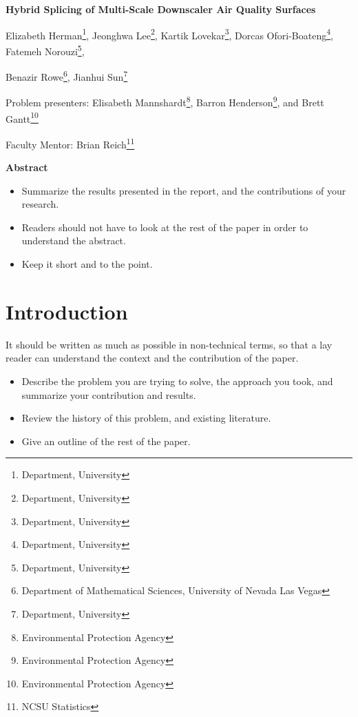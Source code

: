 \documentclass[10pt]{article}
\begin{document}
\centerline{\large \bf Hybrid Splicing of Multi-Scale Downscaler Air Quality Surfaces}

\vspace{.1truein}

\def\thefootnote{\arabic{footnote}}
\begin{center}
  Elizabeth Herman\footnote{Department, University},
  Jeonghwa Lee\footnote{Department, University},
  Kartik Lovekar\footnote{Department, University},
  Dorcas Ofori-Boateng\footnote{Department, University},
  Fatemeh Norouzi\footnote{Department, University},
  
  Benazir Rowe\footnote{Department of Mathematical Sciences, University of Nevada Las Vegas},
  Jianhui Sun\footnote{Department, University}
\end{center}


\begin{center}
Problem presenters: Elisabeth Mannshardt\footnote{Environmental Protection Agency}, Barron Henderson\footnote{Environmental Protection Agency}, and Brett Gantt\footnote{Environmental Protection Agency}

 
Faculty Mentor: Brian Reich\footnote{NCSU Statistics}
\end{center}


\vspace{.3truein}
\centerline{\bf Abstract}

\begin{itemize}
\item Summarize the results presented in the report, and the contributions
of your research.

\item Readers should not have to look at the rest of the paper in order to 
understand the abstract.

\item Keep it short and to the point.
\end{itemize}

\section{Introduction}

It should be written as much as possible in non-technical terms, so that a
lay reader can understand the context and the contribution of the paper.

\begin{itemize}
\item Describe the problem you are trying to solve, the approach
you took, and summarize your contribution and results.

\item Review the history of this problem, and existing literature.

\item Give an outline of the rest of the paper.
\end{itemize}
\end{document}
